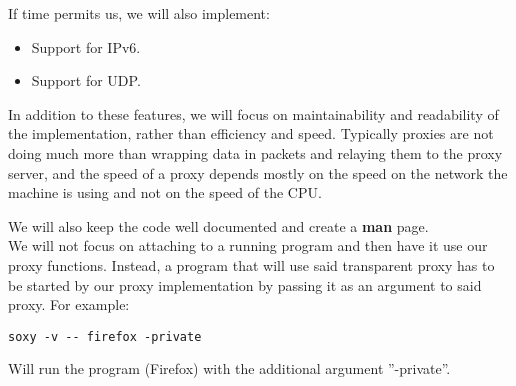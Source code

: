 \documentclass[a4paper]{article}
\begin{document}
If time permits us, we will also implement:

\begin{itemize}
\item Support for IPv6.
\item Support for UDP.
\end{itemize}

In addition to these features, we will focus on maintainability and readability
of the implementation, rather than efficiency and speed. Typically proxies are
not doing much more than wrapping data in packets and relaying them to the proxy
server, and the speed of a proxy depends mostly on the speed on the network the
machine is using and not on the speed of the CPU.

We will also keep the code well documented and create a \textbf{man} page. \\

We will not focus on attaching to a running program and then have it use our
proxy functions. %
Instead, a program that will use said transparent proxy has to be started by our
proxy implementation by passing it as an argument to said proxy. For example:

\begin{verbatim}
soxy -v -- firefox -private
\end{verbatim}

Will run the program (Firefox) with the additional argument ''-private''.
\end{document}
